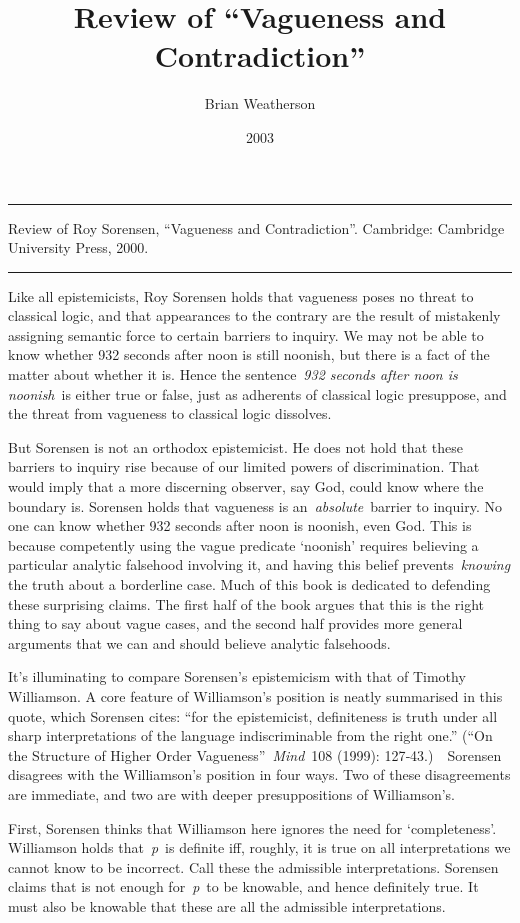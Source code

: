 \documentclass[
  10pt,
  letterpaper,
  DIV=11,
  numbers=noendperiod,
  twoside]{scrartcl}
\title{Review of ``Vagueness and Contradiction''}
\author{Brian Weatherson}
\date{2003}
\renewenvironment{abstract}
 {\vspace{-1.25cm}
 \quotation\small\noindent\rule{\linewidth}{.5pt}\par\smallskip
 \noindent }
 {\par\noindent\rule{\linewidth}{.5pt}\endquotation}
\begin{document}
\maketitle
\begin{abstract}
Review of Roy Sorensen, ``Vagueness and Contradiction''. Cambridge:
Cambridge University Press, 2000.
\end{abstract}

Like all epistemicists, Roy Sorensen holds that vagueness poses no
threat to classical logic, and that appearances to the contrary are the
result of mistakenly assigning semantic force to certain barriers to
inquiry. We may not be able to know whether 932 seconds after noon is
still noonish, but there is a fact of the matter about whether it is.
Hence the sentence~\emph{932 seconds after noon is noonish}~is either
true or false, just as adherents of classical logic presuppose, and the
threat from vagueness to classical logic dissolves.

But Sorensen is not an orthodox epistemicist. He does not hold that
these barriers to inquiry rise because of our limited powers of
discrimination. That would imply that a more discerning observer, say
God, could know where the boundary is. Sorensen holds that vagueness is
an~\emph{absolute}~barrier to inquiry. No one can know whether 932
seconds after noon is noonish, even God. This is because competently
using the vague predicate `noonish' requires believing a particular
analytic falsehood involving it, and having this belief
prevents~\emph{knowing} the truth about a borderline case. Much of this
book is dedicated to defending these surprising claims. The first half
of the book argues that this is the right thing to say about vague
cases, and the second half provides more general arguments that we can
and should believe analytic falsehoods.

It's illuminating to compare Sorensen's epistemicism with that of
Timothy Williamson. A core feature of Williamson's position is neatly
summarised in this quote, which Sorensen cites: ``for the epistemicist,
definiteness is truth under all sharp interpretations of the language
indiscriminable from the right one.'' (``On the Structure of Higher
Order Vagueness''~\emph{Mind}~108 (1999): 127‑43.)~~Sorensen disagrees
with the Williamson's position in four ways. Two of these disagreements
are immediate, and two are with deeper presuppositions of Williamson's.

First, Sorensen thinks that Williamson here ignores the need for
`completeness'. Williamson holds that~\emph{p}~is definite iff, roughly,
it is true on all interpretations we cannot know to be incorrect. Call
these the admissible interpretations. Sorensen claims that is not enough
for~\emph{p}~to be knowable, and hence definitely true. It must also be
knowable that these are all the admissible interpretations.
\end{document}
